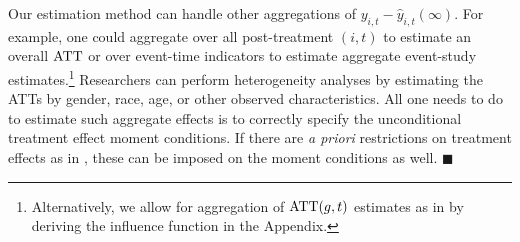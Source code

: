 \documentclass[12pt]{article}
\begin{document}
\begin{remark}

Our estimation method can handle other aggregations of $y_{i,t} - \hat{y}_{i,t}(\infty)$. For example, one could aggregate over all post-treatment $(i,t)$ to estimate an overall $\text{ATT}$ or over event-time indicators to estimate aggregate event-study estimates.\footnote{Alternatively, we allow for aggregation of $\text{ATT}(g,t)$ estimates as in \citet{Callaway_Santanna_2021} by deriving the influence function in the Appendix.
} Researchers can perform heterogeneity analyses by estimating the ATTs by gender, race, age, or other observed characteristics. All one needs to do to estimate such aggregate effects is to correctly specify the unconditional treatment effect moment conditions. If there are \emph{a priori} restrictions on treatment effects as in \citet{Borusyak_Jaravel_Spiess_2021}, these can be imposed on the moment conditions as well. $\blacksquare$
\end{remark}
\end{document}
